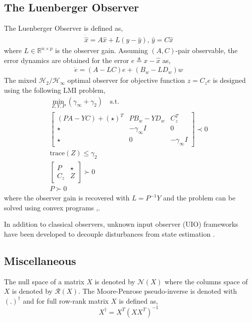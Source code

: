 \subsection{The Luenberger Observer}
The Luenberger Observer is defined as,    
\begin{gather} 
    \dot{\hat{x}}=A \hat{x}+L(y-\hat{y}),\,\hat{y}=C \hat{x}
\end{gather}
where $L\in\mathbb{R}^{n\times p}$ is the observer gain. Assuming $(A,C)$-pair observable, the error dynamics are obtained for the error $e\triangleq x-\hat{x}$ as,
\begin{gather} 
    \dot{e}=(A-LC)e+(B_w-L D_w)w
\end{gather}
The mixed $\mathcal{H}_2/\mathcal{H}_\infty$ optimal observer for objective function $z=C_ze$ is designed using the following LMI problem\cite{duan2013lmis},
\begin{equation} \label{eqn:lmi1}
\begin{split} 
    \min_{Z,Y,P}{(\gamma_\infty+\gamma_2)}\quad \mathrm{s.t.}\\
    \begin{bmatrix}
        (PA-YC)+(\star)^T& PB_w-YD_w& C_z^T\\
        \star& -\gamma_\infty I& 0\\
        \star& 0& -\gamma_\infty I
    \end{bmatrix}\prec 0\\
    \mathrm{trace}(Z)\leq \gamma_2\\
    \begin{bmatrix}
       P& \star\\
       C_z& Z
    \end{bmatrix}\succ 0\\
    P\succ 0
\end{split} 
\end{equation}
where the observer gain is recovered with $L=P^{-1}Y$ and the problem can be solved using convex programs \cite{cvx},\cite{gb08}. 

In addition to classical observers, unknown input observer (UIO) frameworks have been developed to decouple disturbances from state estimation \cite{ChenPatton1999}.

\subsection{Miscellaneous}
The null space of a matrix $X$ is denoted by $\mathcal{N}(X)$ where the columns space of $X$ is denoted by $\mathcal{R}(X)$. 
The Moore-Penrose pseudo-inverse is denoted with $(.)^\dagger$ and for full row-rank matrix $X$ is defined as,
\begin{equation}
    X^\dagger=X^T(XX^T)^{-1}
\end{equation}
